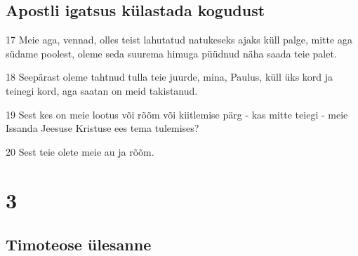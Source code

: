 \section*{Apostli igatsus külastada kogudust}

\par 17 Meie aga, vennad, olles teist lahutatud natukeseks ajaks küll palge, mitte aga südame poolest, oleme seda suurema himuga püüdnud näha saada teie palet.
\par 18 Seepärast oleme tahtnud tulla teie juurde, mina, Paulus, küll üks kord ja teinegi kord, aga saatan on meid takistanud.
\par 19 Sest kes on meie lootus või rõõm või kiitlemise pärg - kas mitte teiegi - meie Issanda Jeesuse Kristuse ees tema tulemises?
\par 20 Sest teie olete meie au ja rõõm.


\chapter{3}

\section*{Timoteose ülesanne}


